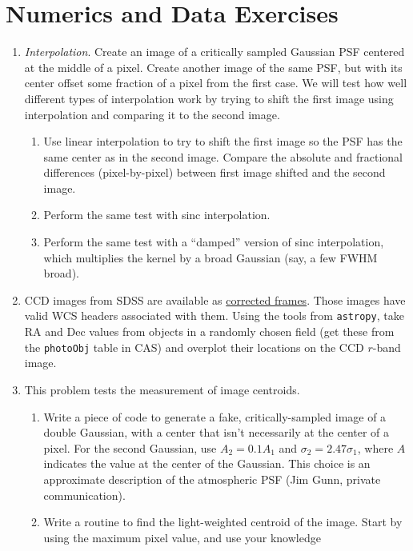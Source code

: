 \section{Numerics and Data Exercises}

\begin{enumerate}
\item {\it Interpolation}. Create an image of a critically sampled
    Gaussian PSF centered at the middle of a pixel. Create another
    image of the same PSF, but with its center offset some fraction of
    a pixel from the first case. We will test how well different types
    of interpolation work by trying to shift the first image using
    interpolation and comparing it to the second image.
\begin{enumerate}
\item Use linear interpolation to try to shift the first image
    so the PSF has the same center as in the second image. Compare the
    absolute and fractional differences (pixel-by-pixel) between first
    image shifted and the second image.
\item
    Perform the same test with sinc interpolation.
\item Perform the same test with a ``damped'' version of sinc
    interpolation, which multiplies the kernel by a broad Gaussian
    (say, a few FWHM broad).
\end{enumerate}
\item CCD images from SDSS are available
as \href{https://www.sdss.org/dr14/imaging/images/#corr}{corrected
frames}. Those images have valid WCS headers associated with
them. Using the tools from {\tt astropy}, take RA and Dec values from
objects in a randomly chosen field (get these from the {\tt photoObj}
table in CAS) and overplot their locations on the CCD $r$-band image.
\item This problem tests the measurement of image centroids.
\begin{enumerate}
\item Write a piece of code to generate a fake, critically-sampled
image of a double Gaussian, with a center that isn't necessarily at
the center of a pixel. For the second Gaussian, use $A_2 = 0.1 A_1$
and $\sigma_2 = 2.47\sigma_1$, where $A$ indicates the value at the
center of the Gaussian. This choice is an approximate description of
the atmospheric PSF (Jim Gunn, private communication).
\item Write a routine to find the light-weighted centroid of the
image. Start by using the maximum pixel value, and use your knowledge

\end{enumerate}
\end{enumerate}
